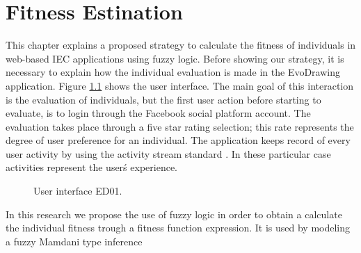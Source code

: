 \chapter{Fitness Estination}

This chapter explains a proposed strategy to calculate the fitness of
individuals in web-based IEC applications
using fuzzy logic. Before showing our strategy, it is necessary to explain how
the individual evaluation is made in the EvoDrawing application. Figure
\ref{fig:UI_ED} shows the user interface.
The main goal of this interaction is the evaluation of individuals, but
the first user action before starting to evaluate, is to login through the
Facebook \cite{facebook} social
platform account. The evaluation takes place through a
five star rating selection; this rate represents the degree of user
preference for an individual. The application keeps record of every user
activity by using the activity stream standard \cite{snell2014json}.
In these particular case activities represent the user\'s experience.

\begin{figure}
\captionsetup{justification=centering,margin=2cm}
\centering
\setlength\fboxsep{0pt}
\setlength\fboxrule{0.7pt}
\caption{User interface ED01.}
\label{fig:UI_ED}
\end{figure}

In this research we propose the use of fuzzy logic \cite{Zadeh1973} in order to
obtain a calculate the individual fitness trough a fitness function expression. It is
used by modeling a fuzzy Mamdani type inference

